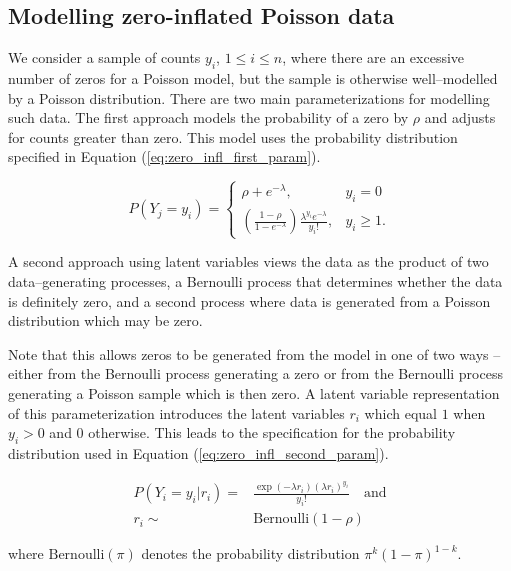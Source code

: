 \subsection{Modelling zero-inflated Poisson data}

We consider a sample of counts $y_i$, $1 \le i\le n$, where there are an
excessive number of zeros for a Poisson model, but the sample is otherwise
well--modelled by a Poisson distribution. There are two main parameterizations
for modelling such data. The first approach models the probability of a zero by
$\rho$ and adjusts for counts greater than zero. This model uses the
probability distribution specified in Equation
(\ref{eq:zero_infl_first_param}).

\begin{equation}
\label{eq:zero_infl_first_param}
	P(Y_j = y_i) = \left\{ \begin{array}{ll}
	\rho + e^{-\lambda},  & y_i = 0 \\
	\left( \frac{1 - \rho}{1 - e^{-\lambda}} \right) \frac{\lambda^{y_i} e^{-\lambda}} {y_i!},  &y_i \ge 1.
	\end{array} \right.
\end{equation}

A second approach using latent variables views the data as the product of two
data--generating processes, a Bernoulli process that determines whether the
data is definitely zero, and a second process where data is generated from a
Poisson distribution which may be zero.

Note that this allows zeros to be generated from the model in one of two ways
-- either from the Bernoulli process generating a zero or from the Bernoulli
process generating a Poisson sample which is then zero. A latent variable
representation of this parameterization introduces the latent variables $r_i$
which equal $1$ when $y_i>0$ and $0$ otherwise. This leads to the specification
for the probability distribution used in Equation
(\ref{eq:zero_infl_second_param}).

\begin{equation}
\label{eq:zero_infl_second_param}
\begin{array}{rl}
	P(Y_i=y_i|r_i) = & \frac{\exp(-\lambda r_i)(\lambda r_i)^{y_i}}{y_i!} \quad \mbox{and} \\
	r_i \sim & \mbox{Bernoulli}(1-\rho)
\end{array}
\end{equation}

\noindent where $\text{Bernoulli}(\pi)$ denotes the probability distribution
$\pi^k (1 - \pi)^{1-k}$.

